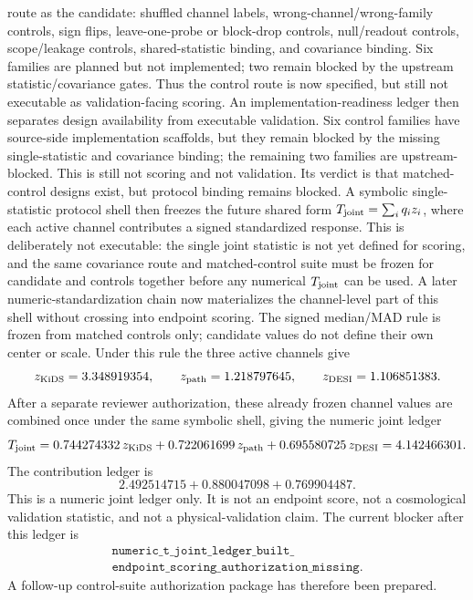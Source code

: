 route as the candidate: shuffled channel labels, wrong-channel/wrong-family
controls, sign flips, leave-one-probe or block-drop controls, null/readout
controls, scope/leakage controls, shared-statistic binding, and covariance
binding.  Six families are planned but not implemented; two remain blocked by
the upstream statistic/covariance gates.  Thus the control route is now
specified, but still not executable as validation-facing scoring.
An implementation-readiness ledger then separates design availability from
executable validation.  Six control families have source-side implementation
scaffolds, but they remain blocked by the missing single-statistic and
covariance binding; the remaining two families are upstream-blocked.  This is
still not scoring and not validation.  Its verdict is that matched-control
designs exist, but protocol binding remains blocked.
A symbolic single-statistic protocol shell then freezes the future shared form
\(T_{\rm joint}=\sum_i q_i z_i\), where each active channel contributes a
signed standardized response.  This is deliberately not executable: the single
joint statistic is not yet defined for scoring, and the same covariance route
and matched-control suite must be frozen for candidate and controls together
before any numerical \(T_{\rm joint}\) can be used.
A later numeric-standardization chain now materializes the channel-level part
of this shell without crossing into endpoint scoring.  The signed
median/MAD rule is frozen from matched controls only; candidate values do not
define their own center or scale.  Under this rule the three active channels
give
\[
  z_{\rm KiDS}=3.348919354,\qquad
  z_{\rm path}=1.218797645,\qquad
  z_{\rm DESI}=1.106851383 .
\]
After a separate reviewer authorization, these already frozen channel values
are combined once under the same symbolic shell, giving the numeric joint
ledger
\[
  T_{\rm joint}
  =
  0.744274332\,z_{\rm KiDS}
  +0.722061699\,z_{\rm path}
  +0.695580725\,z_{\rm DESI}
  =
  4.142466301 .
\]
The contribution ledger is
\[
  2.492514715
  +0.880047098
  +0.769904487 .
\]
This is a numeric joint ledger only.  It is not an endpoint score, not a
cosmological validation statistic, and not a physical-validation claim.  The
current blocker after this ledger is
\[
\begin{gathered}
\texttt{numeric\_t\_joint\_ledger\_built\_}\\
\texttt{endpoint\_scoring\_authorization\_missing}.
\end{gathered}
\]
A follow-up control-suite authorization package has therefore been prepared.
